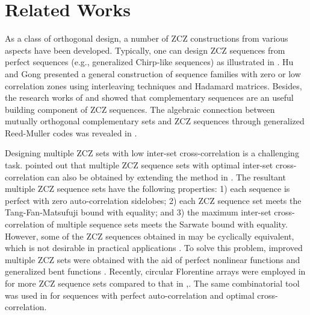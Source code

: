 \section{Related Works}
As a class of orthogonal design, a number of ZCZ constructions from various aspects have been developed. Typically, one can design ZCZ sequences from perfect sequences (e.g., generalized Chirp-like sequences) as illustrated in \cite{Torii04,Hayashi09,Popovic10}. Hu and Gong \cite{Hu10} presented a general construction of sequence families with zero or low correlation zones using interleaving techniques and Hadamard matrices. Besides, the research works of \cite{Deng00} and \cite{Appuswamy06} showed that complementary sequences \cite{Golay61,Tseng72,Liu13,Liu14} are an useful building component of ZCZ sequences. The algebraic connection between mutually orthogonal complementary sets and ZCZ sequences through generalized Reed-Muller codes was revealed in \cite{Liu14-ITW}. 

Designing multiple ZCZ sets with low inter-set cross-correlation \cite{Tang10} is a challenging task. \cite{Zhou17} pointed out that multiple ZCZ sequence sets with optimal inter-set cross-correlation can also be obtained by extending the method in \cite{Popovic10}. The resultant multiple ZCZ sequence sets have the following properties: 1) each sequence is perfect with zero auto-correlation sidelobes; 2) each ZCZ sequence set meets the Tang-Fan-Matsufuji bound with equality; and 3) the maximum inter-set cross-correlation of multiple sequence sets meets the Sarwate bound with equality. However, some of the ZCZ sequences obtained in \cite{Popovic10} may be cyclically equivalent, which is not desirable in practical applications \cite{Golomb2005}. To solve this problem, improved multiple ZCZ sets were obtained with the aid of perfect nonlinear functions \cite{Zhou17} and generalized bent functions \cite{Zhang20}. Recently, circular Florentine arrays were employed in \cite{Zhang22} for more ZCZ sequence sets compared to that in \cite{Zhou17},\cite{Zhang20}. The same combinatorial tool was used in \cite{Song21} for sequences with perfect auto-correlation and optimal cross-correlation.